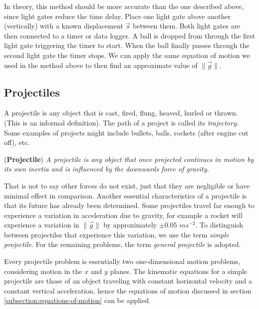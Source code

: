 In theory, this method should be more accurate than the one described above, since light gates reduce the time delay. Place one light gate above another (vertically) with a known displacement $\vec{s}$ between them. Both light gates are then connected to a timer or data logger. A ball is dropped from through the first light gate triggering the timer to start. When the ball finally passes through the second light gate the timer stops. We can apply the same equation of motion we used in the method above to then find an approximate value of $\| \vec{g} \|$.


\subsection{Projectiles}

A projectile is any object that is cast, fired, flung, heaved, hurled or thrown. (This is an informal definition). The path of a project is called its \textit{trajectory}. Some examples of projects might include bullets, balls, rockets (after engine cut off), etc.

\begin{definition}{(\textbf{Projectile})}
\textit{A projectile is any object that once projected continues in motion by its own inertia and is influenced by the downwards force of gravity.}
\end{definition}

That is not to say other forces do not exist, just that they are negligible or have minimal effect in comparison. Another essential characteristics of a projectile is that its future has already been determined. Some projectiles travel far enough to experience a variation in acceleration due to gravity, for example a rocket will experience a variation in $\| \vec{g} \|$ by approximately $\pm 0.05$ $ms^{-2}$. To distinguish between projectiles that experience this variation, we use the term \textit{simple projectile}. For the remaining problems, the term \textit{general projectile} is adopted. 

Every projectile problem is essentially two one-dimensional motion problems, considering motion in the $x$ and $y$ planes. The kinematic equations for a simple projectile are those of an object traveling with constant horizontal velocity and a constant vertical acceleration, hence the equations of motion discussed in section \ref{subsection:equations-of-motion} can be applied. 

